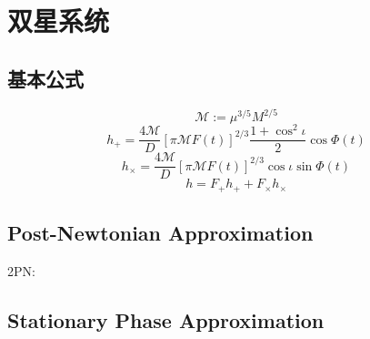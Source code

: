 \chapter{双星系统}

\section{基本公式}

\def\M{\mathcal{M}}
\begin{equation}
    \M:=\mu^{3/5}M^{2/5}
\end{equation}
\begin{equation}
    h_+=\frac{4\M}{D}[\pi \M F(t)]^{2/3}\frac{1+\cos^2\iota}{2}\cos\Phi(t)
\end{equation}
\begin{equation}
    h_\times=\frac{4\M}{D}[\pi \M F(t)]^{2/3}\cos\iota\sin\Phi(t)
\end{equation}
\begin{equation}
    h=F_+h_++F_\times h_\times
\end{equation}

\section{Post-Newtonian Approximation}

2PN: \cite{Blanchet1995,Poisson1995}

\section{Stationary Phase Approximation}

